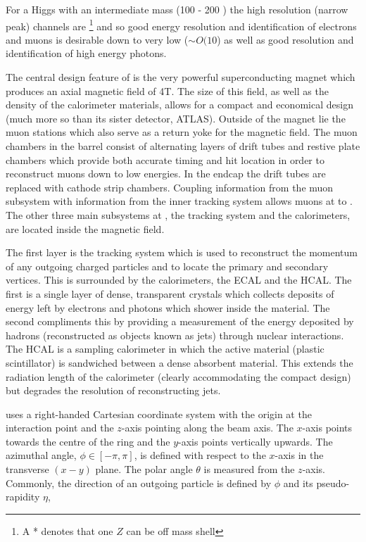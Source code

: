 For a Higgs with an intermediate mass (100 - 200 \GeV) the high resolution (narrow peak) channels are \HZZ \footnote{A * denotes that one $Z$ can be off mass shell} and \Hgg so good energy resolution and identification of electrons and muons is desirable down to very low \pT ($\sim O(10$\GeV) as well as good resolution and identification of high energy photons. 

The central design feature of \CMS is the very powerful superconducting magnet which produces an axial magnetic field of 4T. The size of this field, as well as the density of the calorimeter materials, allows for a compact and economical design (much more so than its sister detector, ATLAS). Outside of the magnet lie the muon stations which also serve as a return yoke for the magnetic field. The muon chambers in the barrel consist of alternating layers of drift tubes and restive plate chambers which provide both accurate timing and hit location in order to reconstruct muons down to low energies. In the endcap the drift tubes are replaced with cathode strip chambers. Coupling information from the muon subsystem with information from the inner tracking system allows muons at \CMS to . The other three main subsystems at \CMS, the tracking system and the calorimeters, are located inside the magnetic field.

The first layer is the tracking system which is used to reconstruct the momentum of any outgoing charged particles and to locate the primary and secondary vertices. This is surrounded by the calorimeters, the \acf{ECAL} and the \acf{HCAL}. The first is a single layer of dense, transparent crystals which collects deposits of energy left by electrons and photons which shower inside the material. The second compliments this by providing a measurement of the energy deposited by hadrons (reconstructed as objects known as jets) through nuclear interactions. The \acf{HCAL} is a sampling calorimeter in which the active material (plastic scintillator) is sandwiched between a dense absorbent material. This extends the radiation length of the calorimeter (clearly accommodating the compact design) but degrades the resolution of reconstructing jets. 

\CMS uses a right-handed Cartesian coordinate system with the origin at the interaction point and the $z$-axis pointing along the beam axis. The $x$-axis points towards the centre of the \LHC ring and the $y$-axis points vertically upwards. The azimuthal angle, $\phi \in [-\pi,\pi]$, is defined with respect to the $x$-axis in the transverse $(x-y)$ plane. The polar angle $\theta$ is measured from the $z$-axis. Commonly, the direction of an outgoing particle is defined by $\phi$ and its pseudo-rapidity $\eta$,

